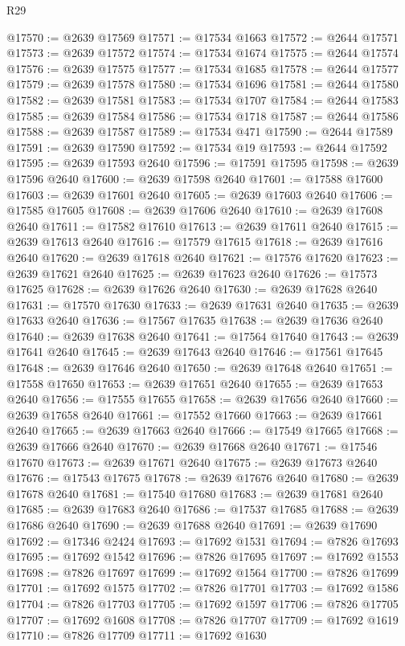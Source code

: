 \begin{lexlean}{R29}
\begin{coremodule}
@17570 := @2639 @17569
@17571 := @17534 @1663
@17572 := @2644 @17571
@17573 := @2639 @17572
@17574 := @17534 @1674
@17575 := @2644 @17574
@17576 := @2639 @17575
@17577 := @17534 @1685
@17578 := @2644 @17577
@17579 := @2639 @17578
@17580 := @17534 @1696
@17581 := @2644 @17580
@17582 := @2639 @17581
@17583 := @17534 @1707
@17584 := @2644 @17583
@17585 := @2639 @17584
@17586 := @17534 @1718
@17587 := @2644 @17586
@17588 := @2639 @17587
@17589 := @17534 @471
@17590 := @2644 @17589
@17591 := @2639 @17590
@17592 := @17534 @19
@17593 := @2644 @17592
@17595 := @2639 @17593 @2640
@17596 := @17591 @17595
@17598 := @2639 @17596 @2640
@17600 := @2639 @17598 @2640
@17601 := @17588 @17600
@17603 := @2639 @17601 @2640
@17605 := @2639 @17603 @2640
@17606 := @17585 @17605
@17608 := @2639 @17606 @2640
@17610 := @2639 @17608 @2640
@17611 := @17582 @17610
@17613 := @2639 @17611 @2640
@17615 := @2639 @17613 @2640
@17616 := @17579 @17615
@17618 := @2639 @17616 @2640
@17620 := @2639 @17618 @2640
@17621 := @17576 @17620
@17623 := @2639 @17621 @2640
@17625 := @2639 @17623 @2640
@17626 := @17573 @17625
@17628 := @2639 @17626 @2640
@17630 := @2639 @17628 @2640
@17631 := @17570 @17630
@17633 := @2639 @17631 @2640
@17635 := @2639 @17633 @2640
@17636 := @17567 @17635
@17638 := @2639 @17636 @2640
@17640 := @2639 @17638 @2640
@17641 := @17564 @17640
@17643 := @2639 @17641 @2640
@17645 := @2639 @17643 @2640
@17646 := @17561 @17645
@17648 := @2639 @17646 @2640
@17650 := @2639 @17648 @2640
@17651 := @17558 @17650
@17653 := @2639 @17651 @2640
@17655 := @2639 @17653 @2640
@17656 := @17555 @17655
@17658 := @2639 @17656 @2640
@17660 := @2639 @17658 @2640
@17661 := @17552 @17660
@17663 := @2639 @17661 @2640
@17665 := @2639 @17663 @2640
@17666 := @17549 @17665
@17668 := @2639 @17666 @2640
@17670 := @2639 @17668 @2640
@17671 := @17546 @17670
@17673 := @2639 @17671 @2640
@17675 := @2639 @17673 @2640
@17676 := @17543 @17675
@17678 := @2639 @17676 @2640
@17680 := @2639 @17678 @2640
@17681 := @17540 @17680
@17683 := @2639 @17681 @2640
@17685 := @2639 @17683 @2640
@17686 := @17537 @17685
@17688 := @2639 @17686 @2640
@17690 := @2639 @17688 @2640
@17691 := @2639 @17690
@17692 := @17346 @2424
@17693 := @17692 @1531
@17694 := @7826 @17693
@17695 := @17692 @1542
@17696 := @7826 @17695
@17697 := @17692 @1553
@17698 := @7826 @17697
@17699 := @17692 @1564
@17700 := @7826 @17699
@17701 := @17692 @1575
@17702 := @7826 @17701
@17703 := @17692 @1586
@17704 := @7826 @17703
@17705 := @17692 @1597
@17706 := @7826 @17705
@17707 := @17692 @1608
@17708 := @7826 @17707
@17709 := @17692 @1619
@17710 := @7826 @17709
@17711 := @17692 @1630

\end{coremodule}
\end{lexlean}
